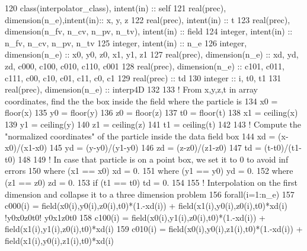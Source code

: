 \begin{DoxyCode}
120     \textcolor{keywordtype}{class}(interpolator\_class), \textcolor{keywordtype}{intent(in)} :: self
121     \textcolor{keywordtype}{real(prec)}, \textcolor{keywordtype}{dimension(n\_e)},\textcolor{keywordtype}{intent(in)}:: x, y, z
122     \textcolor{keywordtype}{real(prec)}, \textcolor{keywordtype}{intent(in)} :: t
123     \textcolor{keywordtype}{real(prec)}, \textcolor{keywordtype}{dimension(n\_fv, n\_cv, n\_pv, n\_tv)}, \textcolor{keywordtype}{intent(in)} :: field
124     \textcolor{keywordtype}{integer}, \textcolor{keywordtype}{intent(in)} :: n\_fv, n\_cv, n\_pv, n\_tv
125     \textcolor{keywordtype}{integer}, \textcolor{keywordtype}{intent(in)} :: n\_e
126     \textcolor{keywordtype}{integer}, \textcolor{keywordtype}{dimension(n\_e)} :: x0, y0, z0, x1, y1, z1
127     \textcolor{keywordtype}{real(prec)}, \textcolor{keywordtype}{dimension(n\_e)} :: xd, yd, zd, c000, c100, c010, c110, c001
128     \textcolor{keywordtype}{real(prec)}, \textcolor{keywordtype}{dimension(n\_e)} :: c101, c011, c111, c00, c10, c01, c11, c0, c1
129     \textcolor{keywordtype}{real(prec)} :: td
130     \textcolor{keywordtype}{integer} :: i, t0, t1
131     \textcolor{keywordtype}{real(prec)}, \textcolor{keywordtype}{dimension(n\_e)} :: interp4D
132 
133     \textcolor{comment}{! From x,y,z,t in array coordinates, find the the box inside the field where the particle is}
134     x0 = floor(x)
135     y0 = floor(y)
136     z0 = floor(z)
137     t0 = floor(t)
138     x1 = ceiling(x)
139     y1 = ceiling(y)
140     z1 = ceiling(z)
141     t1 = ceiling(t)
142 
143     \textcolor{comment}{! Compute the "normalized coordinates" of the particle inside the data field box}
144     xd = (x-x0)/(x1-x0)
145     yd = (y-y0)/(y1-y0)
146     zd = (z-z0)/(z1-z0)
147     td = (t-t0)/(t1-t0)
148 
149     \textcolor{comment}{! In case that particle is on a point box, we set it to 0 to avoid inf errors}
150     \textcolor{keywordflow}{where} (x1 == x0) xd = 0.
151     \textcolor{keywordflow}{where} (y1 == y0) yd = 0.
152     \textcolor{keywordflow}{where} (z1 == z0) zd = 0.
153     \textcolor{keywordflow}{if} (t1 == t0)    td = 0.
154 
155     \textcolor{comment}{! Interpolation on the first dimension and collapse it to a three dimension problem}
156     \textcolor{keywordflow}{forall}(i=1:n\_e)
157         c000(i) = field(x0(i),y0(i),z0(i),t0)*(1.-xd(i)) + field(x1(i),y0(i),z0(i),t0)*xd(i) \textcolor{comment}{!y0x0z0t0! 
       y0x1z0t0}
158         c100(i) = field(x0(i),y1(i),z0(i),t0)*(1.-xd(i)) + field(x1(i),y1(i),z0(i),t0)*xd(i)
159         c010(i) = field(x0(i),y0(i),z1(i),t0)*(1.-xd(i)) + field(x1(i),y0(i),z1(i),t0)*xd(i)

\end{DoxyCode}
